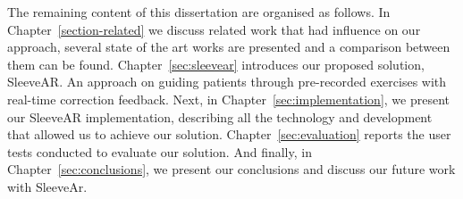 The remaining content of this dissertation are organised as follows. 
In Chapter~\ref{section-related} we discuss related work that had influence on our approach, several state of the art works are presented and a comparison between them can be found. 
Chapter~\ref{sec:sleevear} introduces our proposed solution, SleeveAR. An approach on guiding patients through pre-recorded exercises with real-time correction feedback.
Next, in Chapter~\ref{sec:implementation}, we present our SleeveAR implementation, describing all the technology and development that allowed us to achieve our solution.
Chapter~\ref{sec:evaluation} reports the user tests conducted to evaluate our solution. 
And finally, in Chapter~\ref{sec:conclusions}, we present our conclusions and discuss our future work with SleeveAr.